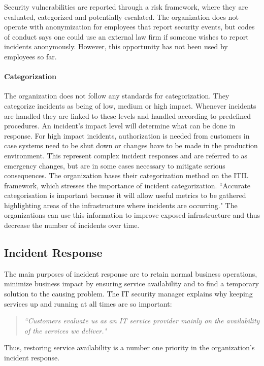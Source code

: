 Security vulnerabilities are reported through a risk framework, where they are evaluated, categorized and potentially escalated. The organization does not operate with anonymization for employees that report security events, but codes of conduct says one could use an external law firm if someone wishes to report incidents anonymously. However, this opportunity has not been used by employees so far. 

\paragraph{Categorization}
The organization does not follow any standards for categorization. They categorize incidents as being of low, medium or high impact. Whenever incidents are handled they are linked to these levels and handled according to predefined procedures. An incident's impact level will determine what can be done in response. For high impact incidents, authorization is needed from customers in case systems need to be shut down or changes have to be made in the production environment. This represent complex incident responses and are referred to as emergency changes, but are in some cases necessary to mitigate serious consequences. 
The organization bases their categorization method on the ITIL framework, which stresses the importance of incident categorization. ``Accurate categorisation is important because it will allow useful metrics to be gathered highlighting areas of the infrastructure where incidents are occurring\cite{itilbok}." The organizations can use this information to improve exposed infrastructure and thus decrease the number of incidents over time.

\subsection{Incident Response}
The main purposes of incident response are to retain normal business operations, minimize business impact by ensuring service availability and to find a temporary solution to the causing problem. The IT security manager explains why keeping services up and running at all times are so important:

\begin{quote}
\textit{``Customers evaluate us as an IT service provider mainly on the availability of the services we deliver."}
\end{quote}
Thus, restoring service availability is a number one priority in the organization's incident response.

